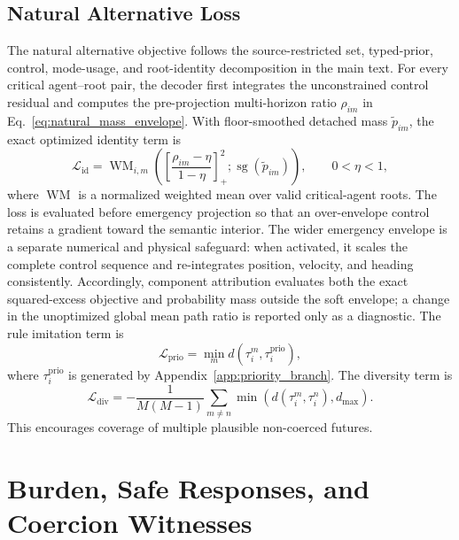 \documentclass[10pt]{article}
\begin{document}
\subsection{Natural Alternative Loss}
\label{app:natural_loss}

The natural alternative objective follows the source-restricted set, typed-prior, control, mode-usage, and root-identity decomposition in the main text. For every critical agent--root pair, the decoder first integrates the unconstrained control residual and computes the pre-projection multi-horizon ratio $\rho_{im}$ in Eq.~\eqref{eq:natural_mass_envelope}. With floor-smoothed detached mass $\widetilde p_{im}$, the exact optimized identity term is
\begin{equation}
    \mathcal{L}_{\mathrm{id}}
    =
    \operatorname{WM}_{i,m}
    \left(
      \left[
        \frac{\rho_{im}-\eta}{1-\eta}
      \right]_+^2;
      \operatorname{sg}(\widetilde p_{im})
    \right),
    \qquad 0<\eta<1,
\end{equation}
where $\operatorname{WM}$ is a normalized weighted mean over valid critical-agent roots. The loss is evaluated before emergency projection so that an over-envelope control retains a gradient toward the semantic interior. The wider emergency envelope is a separate numerical and physical safeguard: when activated, it scales the complete control sequence and re-integrates position, velocity, and heading consistently. Accordingly, component attribution evaluates both the exact squared-excess objective and probability mass outside the soft envelope; a change in the unoptimized global mean path ratio is reported only as a diagnostic.
The rule imitation term is
\begin{equation}
    \mathcal{L}_{\mathrm{prio}}
    =
    \min_m
    d(\tau_i^m,\tau_i^{\mathrm{prio}}),
\end{equation}
where $\tau_i^{\mathrm{prio}}$ is generated by Appendix~\ref{app:priority_branch}. The diversity term is
\begin{equation}
    \mathcal{L}_{\mathrm{div}}
    =
    -
    \frac{1}{M(M-1)}
    \sum_{m\neq n}
    \min
    \left(
    d(\tau_i^m,\tau_i^n),
    d_{\max}
    \right).
\end{equation}
This encourages coverage of multiple plausible non-coerced futures.

\section{Burden, Safe Responses, and Coercion Witnesses}
\label{app:burden_witness}
\end{document}

